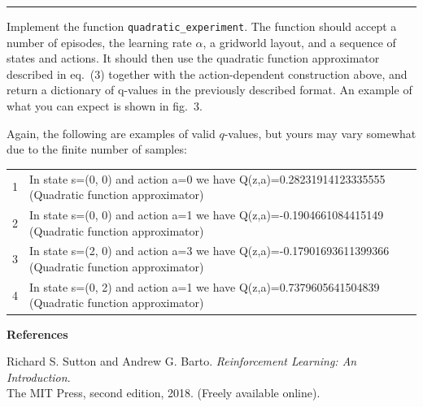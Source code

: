 \documentclass[11pt]{article}
\begin{document}
\vspace{0.15cm}
\noindent\rule{\textwidth}{0.4pt}

\vspace{1.2cm}

\begin{tcolorbox}[enhanced,colback=white,colframe=gray!70,boxrule=0.4pt,arc=2.5mm,left=10pt,right=10pt,top=12pt,bottom=12pt]
\noindent
{}

\vspace{0.45em}

Implement the function \texttt{quadratic\_experiment}. The function should accept a number of episodes, the learning rate $\alpha$, a gridworld layout, and a sequence of states and actions. It should then use the quadratic function approximator described in eq.\ (3) together with the action-dependent construction above, and return a dictionary of q-values in the previously described format. An example of what you can expect is shown in fig.\ 3.
\end{tcolorbox}

\vspace{0.9cm}

\begin{center}
\parbox{0.88\textwidth}{\centering Again, the following are examples of valid $q$-values, but yours may vary somewhat due to the finite number of samples:}
\end{center}

\vspace{0.55cm}

{\footnotesize
\begin{tabular}{@{}r l@{}}
1 & In state s=(0, 0) and action a=0 we have Q(z,a)=0.28231914123335555 (Quadratic function approximator)\\
2 & In state s=(0, 0) and action a=1 we have Q(z,a)=-0.1904661084415149 (Quadratic function approximator)\\
3 & In state s=(2, 0) and action a=3 we have Q(z,a)=-0.17901693611399366 (Quadratic function approximator)\\
4 & In state s=(0, 2) and action a=1 we have Q(z,a)=0.7379605641504839 (Quadratic function approximator)
\end{tabular}
}

\vspace{1.6cm}

{\huge \textbf{References}}

\vspace{0.8cm}

\noindent [SB18]\hspace{0.8em}Richard S. Sutton and Andrew G. Barto. \textit{Reinforcement Learning: An Introduction}.\\
\hspace*{3.9em}The MIT Press, second edition, 2018. (Freely available online).
\end{document}
